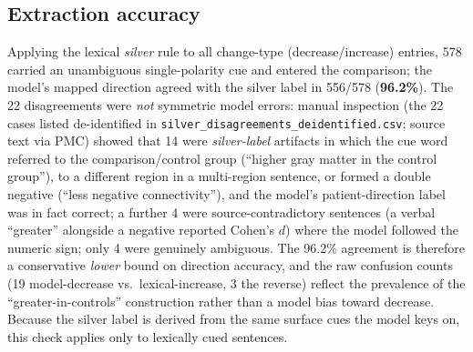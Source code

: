 \documentclass[11pt]{article}
\begin{document}
\subsection{Extraction accuracy}
Applying the lexical \emph{silver} rule to all change-type (decrease/increase)
entries, 578 carried an unambiguous single-polarity cue and entered the
comparison; the model's mapped direction agreed with the silver label in 556/578
(\textbf{96.2\%}). The 22 disagreements were \emph{not} symmetric model errors:
manual inspection (the 22 cases listed de-identified in
\texttt{silver\_disagreements\_deidentified.csv}; source text via PMC) showed that 14
were \emph{silver-label} artifacts in which the cue word referred to the
comparison/control group (``higher gray matter in the control group''), to a
different region in a multi-region sentence, or formed a double negative (``less
negative connectivity''), and the model's patient-direction label was in fact
correct; a further 4 were source-contradictory sentences (a verbal ``greater''
alongside a negative reported Cohen's $d$) where the model followed the numeric
sign; only 4 were genuinely ambiguous. The 96.2\% agreement is therefore a
conservative \emph{lower} bound on direction accuracy, and the raw confusion
counts (19 model-decrease vs.\ lexical-increase, 3 the reverse) reflect the
prevalence of the ``greater-in-controls'' construction rather than a model bias
toward decrease. Because the silver label is derived from the same surface cues
the model keys on, this check applies only to lexically cued sentences.
\end{document}

